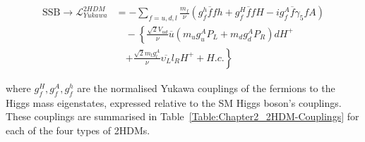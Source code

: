 \begin{equation}
\begin{aligned}
    \text{SSB} \rightarrow \mathcal{L}_{Yukawa}^{2HDM} &= - \sum\limits_{f=u,d,l} \frac{m_f}{\nu} 
    \left(g_f^h \overline{f}f h + g_f^H\overline{f}f H - i g_f^A\overline{f} \gamma_5 f A \right) \\
    &\quad - \left\{ \frac{\sqrt{2}V_{ud}}{\nu} \overline{u} 
    \left(m_u g_u^A P_L + m_d g_d^A P_R \right) d H^+ \right. \\
    &\quad \left. + \frac{\sqrt{2}m_l g_{l}^A}{\nu} \overline{\upsilon
_L} l_R H^+ + H.c. \right\}
\end{aligned}
\label{Equation:Chapter2_2HDM-YukawaLagrangian}
\end{equation}

where $g_f^H,g_f^A,g_f^h$ are the normalised Yukawa couplings of the fermions to the Higgs mass eigenstates, expressed relative to the SM Higgs boson's couplings. These couplings are summarised in Table~\ref{Table:Chapter2_2HDM-Couplings} for each of the four types of 2HDMs.


